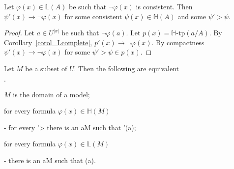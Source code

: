 \documentclass[11pt,oneside]{amsart}
\newcommand{\mylabel}[1]{{#1}\hfill}
\renewenvironment{itemize}
  {\begin{list}{$\cdot$}{%
  \setlength{\parskip}{0mm}
  \setlength{\topsep}{.2\baselineskip}
  \setlength{\rightmargin}{0mm}
  \setlength{\listparindent}{0mm}
  \setlength{\itemindent}{0mm}
  \setlength{\labelwidth}{3ex}
  \setlength{\itemsep}{.2\baselineskip}
  \setlength{\parsep}{.2\baselineskip}
  \setlength{\partopsep}{0mm}
  \setlength{\labelsep}{1ex}
  \setlength{\leftmargin}{\labelwidth+\labelsep}
  \let\makelabel\mylabel}}{%
\end{list}}
\begin{document}
\begin{proposition}\label{prop_LHapprox2}
  Let $\varphi(x)\in\mathds{L}(A)$ be such that $\neg\varphi(x)$ is consistent.
  Then  $\psi'(x)\rightarrow\neg\varphi(x)$ for some consistent $\psi(x)\in\mathds{H}(A)$ and some $\psi'>\psi$.
\end{proposition}



\begin{proof}
  Let $a\in U^{|x|}$ be such that $\neg\varphi(a)$.
  Let $p(x)=\mathds{H}\mbox{-tp}(a/A)$.
  By Corollary~\ref{corol_Lcomplete}, $p'(x)\rightarrow\neg\varphi(x)$. 
  By compactness  $\psi'(x)\rightarrow\neg\varphi(x)$ for some $\psi'>\psi\in p(x)$. 
\end{proof}

\begin{proposition} 
  Let $M$ be a subset of $U$.
  Then the following are equivalent
  \begin{itemize}
    \item[1.] $M$ is the domain of a model;
    \item[2.] for every formula $\varphi(x)\in\mathds{H}(M)$
    
    \noindent\kern-\leftmargin
    {\textrm{ for every }\varphi'>\varphi\textrm{ there is an }a\in M\textrm{ such that }\varphi'(a);}
    \item[3.] for every formula $\varphi(x)\in\mathds{L}(M)$
    
    \noindent\kern-\leftmargin
    {\textrm{ there is an }a\in M\textrm{ such that }\neg\varphi(a).}
    
  \end{itemize}
\end{proposition}
\end{document}
